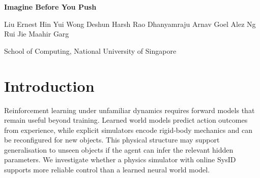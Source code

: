 \documentclass[12pt]{article}
\begin{document}
\begin{center}
{\LARGE\bfseries Imagine Before You Push\par}
\vspace{0.35em}
{\scriptsize Liu Ernest Hin Yui \quad Wong Deshun \quad Harsh Rao Dhanyamraju \quad Arnav Goel \quad Alez Ng Rui Jie \quad Maahir Garg\par}
\vspace{0.05em}
{\footnotesize School of Computing, National University of Singapore\par}
\end{center}
\vspace{-0.8em}

\begin{abstract}
We investigate whether an explicit physics simulator can serve as a reinforcement-learning
agent's imagination to improve control under unseen or out-of-distribution (OOD) dynamics.
As a proxy task, we study toppling-safe pushing: moving an upright cuboid to a goal without
knocking it over, a problem relevant to handling fragile items in warehouses. The object's
mass $m$, floor friction coefficient $\mu$, and centre-of-mass (COM) height $h_c$ are hidden.
The agent observes only the remaining goal distance $d$, tilt $\psi$, translational velocity
$\dot{x}$, angular velocity $\dot{\psi}$, and geometry $G$, making the task partially
observable. Our approach combines online Bayesian system identification using Sequential
Monte Carlo squared (SMC\textsuperscript{2}) to infer the hidden parameters, a physics
engine to forecast candidate actions, and a customised soft actor--critic (SAC) policy called
the delta actor--critic to select pushes. Direct training collapses to an inactive policy,
while a reverse curriculum yields approximately 81\% success across 1.0\,m training episodes.
At 1.0\,m, physics has lower recorded toppling than both comparators.
Held-out OOD success is 47.5\% for physics, 33.8\% for the learned model,
and 3.8\% for model-free control. These
results support our hypothesis that explicit tipping mechanics provide useful structure
for imagination under unfamiliar dynamics. Although the study is exploratory and entirely
sim-to-sim, system-identification analysis also shows that successful control can persist
despite substantial parameter-estimation errors, with some OOD shifts remaining challenging.
\end{abstract}

\section{Introduction}\label{sec:intro}
Reinforcement learning under unfamiliar dynamics requires forward models that remain useful beyond training. Learned world models predict action outcomes from experience, while explicit simulators encode rigid-body mechanics and can be reconfigured for new objects. This physical structure may support generalisation to unseen objects if the agent can infer the relevant hidden parameters. We investigate whether a physics simulator with online SysID supports more reliable control than a learned neural world model.
\end{document}
